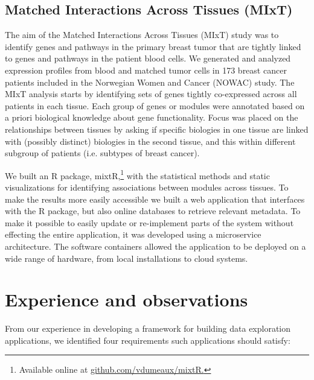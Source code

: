 \subsection{Matched Interactions Across Tissues (MIxT)}
The aim of the Matched Interactions Across Tissues (MIxT) study was to identify
genes and pathways in the primary breast tumor that are tightly linked to genes
and pathways in the patient blood cells.\cite{vanessa} We generated and analyzed
expression profiles from blood and matched tumor cells in 173 breast cancer
patients included in the Norwegian Women and Cancer (NOWAC) study.  The MIxT
analysis starts by identifying sets of genes tightly co-expressed across all
patients in each tissue. Each group of genes or modules were annotated based on
a priori biological knowledge about gene functionality.  Focus was placed
on the relationships between tissues by asking if specific biologies in one
tissue are linked with (possibly distinct) biologies in the second tissue, and
this within different subgroup of patients (i.e. subtypes of breast cancer).

We built an R package, mixtR,\footnote{Available online at
\url{github.com/vdumeaux/mixtR.}} with the statistical methods and static
visualizations for identifying associations between modules across tissues. To
make the results more easily accessible we built a web application that
interfaces with the R package, but also online databases to retrieve relevant
metadata. To make it possible to easily update or re-implement parts of the
system without effecting the entire application, it was developed using a
microservice architecture. The software containers allowed the application to
be deployed on a wide range of hardware, from local installations to cloud
systems.

\section{Experience and observations} 

From our experience in developing a framework for building data exploration
applications, we identified four requirements such applications should satisfy: 

